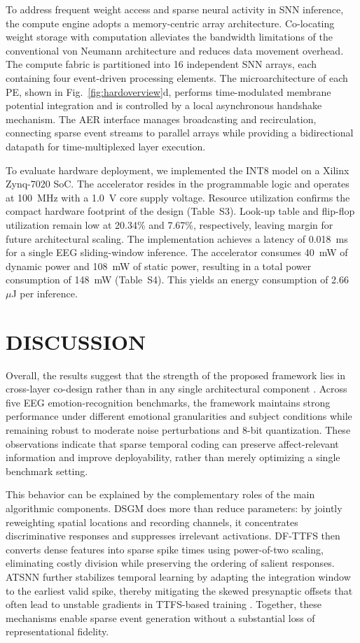 \documentclass{nsr}
\begin{document}
To address frequent weight access and sparse neural activity in SNN inference, the compute engine adopts a memory-centric array architecture. Co-locating weight storage with computation alleviates the bandwidth limitations of the conventional von Neumann architecture and reduces data movement overhead. The compute fabric is partitioned into 16 independent SNN arrays, each containing four event-driven processing elements. The microarchitecture of each PE, shown in Fig.~\ref{fig:hardoverview}d, performs time-modulated membrane potential integration and is controlled by a local asynchronous handshake mechanism. The AER interface manages broadcasting and recirculation, connecting sparse event streams to parallel arrays while providing a bidirectional datapath for time-multiplexed layer execution.

To evaluate hardware deployment, we implemented the INT8 model on a Xilinx Zynq-7020 SoC. The accelerator resides in the programmable logic and operates at 100~MHz with a 1.0~V core supply voltage. Resource utilization confirms the compact hardware footprint of the design (Table~S3). Look-up table and flip-flop utilization remain low at 20.34\% and 7.67\%, respectively, leaving margin for future architectural scaling. The implementation achieves a latency of 0.018~ms for a single EEG sliding-window inference. The accelerator consumes 40~mW of dynamic power and 108~mW of static power, resulting in a total power consumption of 148~mW (Table~S4). This yields an energy consumption of 2.66~$\mu$J per inference.


\section{DISCUSSION}
Overall, the results suggest that the strength of the proposed framework lies in cross-layer co-design rather than in any single architectural component \cite{ref71}. Across five EEG emotion-recognition benchmarks, the framework maintains strong performance under different emotional granularities and subject conditions while remaining robust to moderate noise perturbations and 8-bit quantization. These observations indicate that sparse temporal coding can preserve affect-relevant information and improve deployability, rather than merely optimizing a single benchmark setting.

This behavior can be explained by the complementary roles of the main algorithmic components. DSGM does more than reduce parameters: by jointly reweighting spatial locations and recording channels, it concentrates discriminative responses and suppresses irrelevant activations. DF-TTFS then converts dense features into sparse spike times using power-of-two scaling, eliminating costly division while preserving the ordering of salient responses. ATSNN further stabilizes temporal learning by adapting the integration window to the earliest valid spike, thereby mitigating the skewed presynaptic offsets that often lead to unstable gradients in TTFS-based training \cite{ref70}. Together, these mechanisms enable sparse event generation without a substantial loss of representational fidelity.
\end{document}
